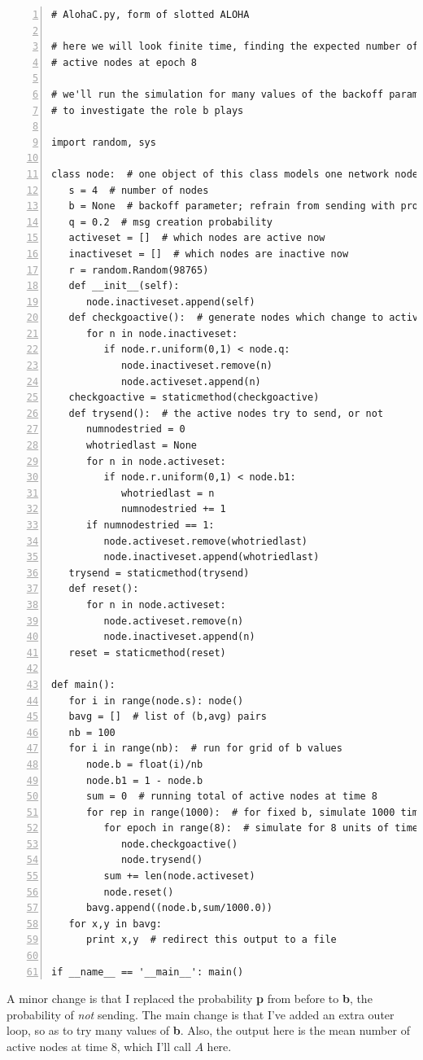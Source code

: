 \begin{Verbatim}[fontsize=\relsize{-2},numbers=left]
# AlohaC.py, form of slotted ALOHA

# here we will look finite time, finding the expected number of
# active nodes at epoch 8

# we'll run the simulation for many values of the backoff parameter b,
# to investigate the role b plays

import random, sys 

class node:  # one object of this class models one network node
   s = 4  # number of nodes
   b = None  # backoff parameter; refrain from sending with probability b
   q = 0.2  # msg creation probability
   activeset = []  # which nodes are active now
   inactiveset = []  # which nodes are inactive now
   r = random.Random(98765)  
   def __init__(self):  
      node.inactiveset.append(self)
   def checkgoactive():  # generate nodes which change to active
      for n in node.inactiveset:
         if node.r.uniform(0,1) < node.q:
            node.inactiveset.remove(n)
            node.activeset.append(n)
   checkgoactive = staticmethod(checkgoactive)  
   def trysend():  # the active nodes try to send, or not
      numnodestried = 0  
      whotriedlast = None  
      for n in node.activeset:
         if node.r.uniform(0,1) < node.b1:
            whotriedlast = n
            numnodestried += 1
      if numnodestried == 1:
         node.activeset.remove(whotriedlast)
         node.inactiveset.append(whotriedlast)
   trysend = staticmethod(trysend)  
   def reset():  
      for n in node.activeset:
         node.activeset.remove(n)
         node.inactiveset.append(n)
   reset = staticmethod(reset)  
            
def main():
   for i in range(node.s): node()
   bavg = []  # list of (b,avg) pairs
   nb = 100
   for i in range(nb):  # run for grid of b values
      node.b = float(i)/nb
      node.b1 = 1 - node.b
      sum = 0  # running total of active nodes at time 8
      for rep in range(1000):  # for fixed b, simulate 1000 times
         for epoch in range(8):  # simulate for 8 units of time
            node.checkgoactive()
            node.trysend()
         sum += len(node.activeset) 
         node.reset()
      bavg.append((node.b,sum/1000.0))
   for x,y in bavg:
      print x,y  # redirect this output to a file

if __name__ == '__main__': main()
\end{Verbatim}

A minor change is that I replaced the probability {\bf p} from before to 
{\bf b}, the probability of {\it not} sending.  The main change is that
I've added an extra outer loop, so as to try many values of {\bf b}.
Also, the output here is the mean number of active nodes at time 8,
which I'll call $A$ here.

